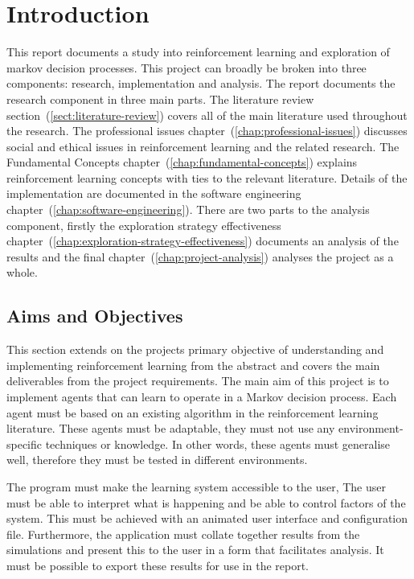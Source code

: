 \documentclass[]{final_report}
\begin{document}

\chapter{Introduction}

This report documents a study into reinforcement learning and exploration of markov decision processes. This project can broadly be broken into three components: research, implementation and analysis. The report documents the research component in three main parts. The literature review section~(\ref{sect:literature-review}) covers all of the main literature used throughout the research. The professional issues chapter~(\ref{chap:professional-issues}) discusses social and ethical issues in reinforcement learning and the related research. The Fundamental Concepts chapter~(\ref{chap:fundamental-concepts}) explains reinforcement learning concepts with ties to the relevant literature. Details of the implementation are documented in the software engineering chapter~(\ref{chap:software-engineering}). There are two parts to the analysis component, firstly the exploration strategy effectiveness chapter~(\ref{chap:exploration-strategy-effectiveness}) documents an analysis of the results and the final chapter~(\ref{chap:project-analysis}) analyses the project as a whole.

\section{Aims and Objectives}

This section extends on the projects primary objective of understanding and implementing reinforcement learning from the abstract and covers the main deliverables from the project requirements. The main aim of this project is to implement agents that can learn to operate in a Markov decision process. Each agent must be based on an existing algorithm in the reinforcement learning literature. These agents must be adaptable, they must not use any environment-specific techniques or knowledge. In other words, these agents must generalise well, therefore they must be tested in different environments.

The program must make the learning system accessible to the user, The user must be able to interpret what is happening and be able to control factors of the system. This must be achieved with an animated user interface and configuration file. Furthermore, the application must collate together results from the simulations and present this to the user in a form that facilitates analysis. It must be possible to export these results for use in the report. 
\end{document}
